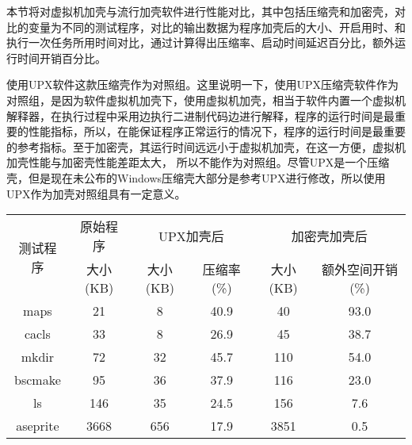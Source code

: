 本节将对虚拟机加壳与流行加壳软件进行性能对比，其中包括压缩壳和加密壳，对比的变量为不同的测试程序，对比的输出数据为程序加壳后的大小、开启用时、和执行一次任务所用时间对比，通过计算得出压缩率、启动时间延迟百分比，额外运行时间开销百分比。

使用UPX软件这款压缩壳作为对照组。这里说明一下，使用UPX压缩壳软件作为对照组，是因为软件虚拟机加壳下，使用虚拟机加壳，相当于软件内置一个虚拟机解释器，在执行过程中采用边执行二进制代码边进行解释，程序的运行时间是最重要的性能指标，所以，在能保证程序正常运行的情况下，程序的运行时间是最重要的参考指标。至于加密壳，其运行时间远远小于虚拟机加壳，在这一方便，虚拟机加壳性能与加密壳性能差距太大， 所以不能作为对照组。尽管UPX是一个压缩壳，但是现在未公布的Windows压缩壳大部分是参考UPX进行修改，所以使用UPX作为加壳对照组具有一定意义。

\begin{table}[htbp]
	\centering
	\begin{tabular}{c|c|cc|cc}
		\bottomrule[1.5pt]
		\multirow{2}{*}{测试程序} & 原始程序   & \multicolumn{2}{c|}{UPX加壳后} & \multicolumn{2}{c}{加密壳加壳后} \\ \cline{2-6} 
		& 大小(KB) & 大小(KB)       & 压缩率(\%)      & 大小(KB)     & 额外空间开销(\%)     \\ \hline
		maps                  & 21     & 8            & 40.9         & 40         & 93.0           \\ \hline
		cacls                 & 33     & 8            & 26.9         & 45         & 38.7           \\ \hline
		mkdir                 & 72     & 32           & 45.7         & 110        & 54.0           \\ \hline
		bscmake               & 95     & 36           & 37.9         & 116        & 23.0           \\ \hline
		ls                    & 146    & 35           & 24.5         & 156        & 7.6            \\ \hline
		aseprite              & 3668   & 656          & 17.9         & 3851       & 0.5            \\ 
		\toprule[1.5pt]
	\end{tabular}

	\label{changesize}
\end{table}



